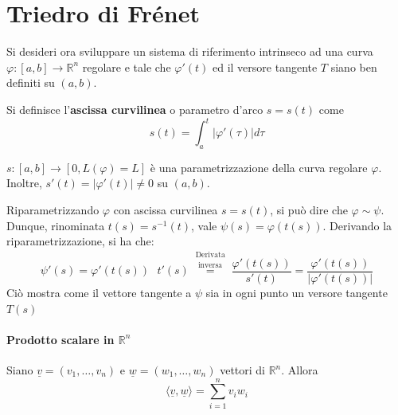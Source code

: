 \section{Triedro di Frénet}
Si desideri ora sviluppare un sistema di riferimento intrinseco ad una curva $\varphi:[a, b] \to \mathbb{R}^n$ regolare e tale che $\varphi'(t)$ ed il versore tangente $T$ siano ben definiti su $(a, b)$.
\begin{definition}
    Si definisce l'\textbf{ascissa curvilinea} o parametro d'arco $s=s(t)$ come
    \begin{equation}
        s(t)=\int_a^t{\left\lvert \varphi'(\tau) \right\rvert d\tau}
    \end{equation}
    \end{definition}
    \begin{oss}
        $s:[a,b] \to [0, L(\varphi)=L]$ è una parametrizzazione della curva regolare $\varphi$. Inoltre, $s'(t)=|\varphi'(t)| \neq 0$ su $(a,b)$.
    \end{oss} 
    \begin{oss}
        Riparametrizzando $\varphi$ con ascissa curvilinea $s=s(t)$, si può dire che $\varphi\sim\psi$. Dunque, rinominata $t(s)=s^{-1}(t)$, vale $\psi(s)=\varphi(t(s))$. Derivando la riparametrizzazione, si ha che:
        \begin{equation}
            \psi'(s)=\varphi'(t(s)) \text{ } t'(s) \overset{\substack{\text{Derivata}\\\text{ inversa}}}{=} \frac{\varphi'(t(s))}{s'(t)} = \frac{\varphi'(t(s))}{|\varphi'(t(s))|}
        \end{equation}
        Ciò mostra come il vettore tangente a $\psi$ sia in ogni punto un versore tangente $T(s)$
    \end{oss}

\paragraph*{Prodotto scalare in $\mathbb{R}^n$}
Siano $\underline{v}=(v_1, \dots, v_n)$ e $\underline{w}=(w_1, \dots, w_n)$ vettori di $\mathbb{R}^n$. Allora
\begin{equation}
    \langle \underline{v}, \underline{w} \rangle = \sum\limits_{i=1}^{n}{v_iw_i} 
\end{equation}
